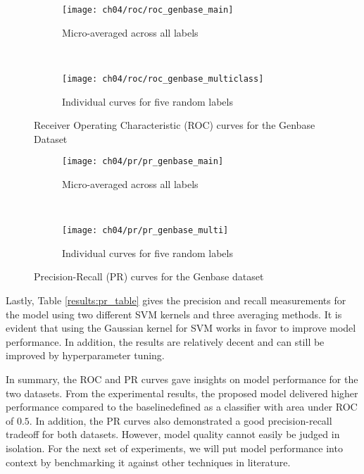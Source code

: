 \begin{figure}[t]
    \centering
    \begin{subfigure}[b]{0.45\textwidth}
        \texttt{[image: ch04/roc/roc\_genbase\_main]}
        \caption{Micro-averaged across all labels}
        \label{results:roc_genbase_main}
    \end{subfigure}
    ~ %
    \begin{subfigure}[b]{0.45\textwidth}
        \texttt{[image: ch04/roc/roc\_genbase\_multiclass]}
        \caption{Individual curves for five random labels}
        \label{results:roc_genbase_multiclass}
    \end{subfigure}
    \caption{Receiver Operating Characteristic (ROC) curves for the Genbase
    Dataset}
    \label{results:roc_genbase}
\end{figure}


\begin{figure}[t]
    \centering
    \begin{subfigure}[b]{0.45\textwidth}
        \texttt{[image: ch04/pr/pr\_genbase\_main]}
        \caption{Micro-averaged across all labels}
        \label{results:pr_genbase_main}
    \end{subfigure}
    ~ %
    \begin{subfigure}[b]{0.45\textwidth}
        \texttt{[image: ch04/pr/pr\_genbase\_multi]}
        \caption{Individual curves for five random labels}
        \label{results:pr_genbase_multi}
    \end{subfigure}
    \caption{Precision-Recall (PR) curves for the Genbase dataset}
    \label{results:pr_genbase}
\end{figure}

\par Lastly, Table \ref{results:pr_table} gives the precision and recall
measurements for the model using two different SVM kernels and three averaging
methods. It is evident that using the Gaussian kernel for SVM works in favor to
improve model performance. In addition, the results are relatively decent and
can still be improved by hyperparameter tuning.



\par In summary, the ROC and PR curves gave insights on model performance for
the two datasets. From the experimental results, the proposed model delivered
higher performance compared to the baseline\textemdash  defined as a classifier
with area under ROC of $0.5$. In addition, the PR curves also demonstrated a
good precision-recall tradeoff for both datasets. However, model quality cannot
easily be judged in isolation. For the next set of experiments, we will put
model performance into context by benchmarking it against other techniques in
literature. 

